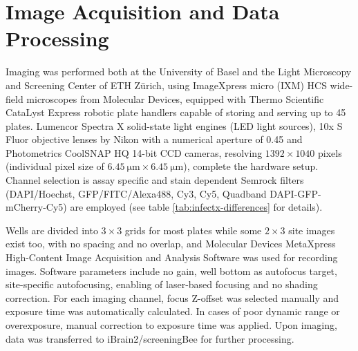 \section{Image Acquisition and Data Processing}
Imaging was performed both at the University of Basel and the Light Microscopy and Screening Center of ETH Z\"urich, using ImageXpress micro (IXM) HCS wide-field microscopes from Molecular Devices, equipped with Thermo Scientific CataLyst Express robotic plate handlers capable of storing and serving up to 45 plates. Lumencor Spectra X solid-state light engines (LED light sources), 10x S Fluor objective lenses by Nikon with a numerical aperture of 0.45 and Photometrics CoolSNAP HQ 14-bit CCD cameras, resolving $1392 \times 1040$ pixels (individual pixel size of $\SI{6.45}{\micro\meter} \times \SI{6.45}{\micro\meter}$), complete the hardware setup. Channel selection is assay specific and stain dependent Semrock filters (DAPI\slash Hoechst, GFP\slash FITC\slash Alexa488, Cy3, Cy5, Quadband DAPI-GFP-mCherry-Cy5) are employed (see table \ref{tab:infectx-differences} for details).

Wells are divided into $3 \times 3$ grids for most plates while some $2 \times 3$ site images exist too, with no spacing and no overlap, and Molecular Devices MetaXpress High-Content Image Acquisition and Analysis Software was used for recording images. Software parameters include no gain, well bottom as autofocus target, site-specific autofocusing, enabling of laser-based focusing and no shading correction. For each imaging channel, focus Z-offset was selected manually and exposure time was automatically calculated. In cases of poor dynamic range or overexposure, manual correction to exposure time was applied. Upon imaging, data was transferred to iBrain2\slash screeningBee \citep{Rouilly2012} for further processing.


